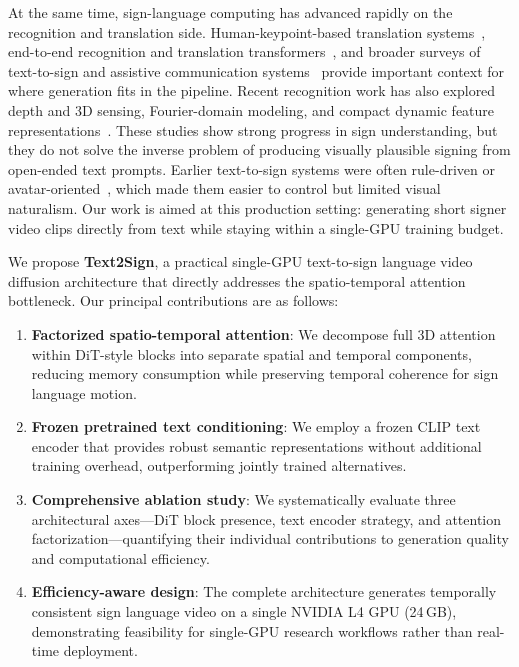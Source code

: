 \documentclass{ieeeaccess}
\begin{document}
At the same time, sign-language computing has advanced rapidly on the recognition and translation side. Human-keypoint-based translation systems~\cite{ko2019neural}, end-to-end recognition and translation transformers~\cite{maia2025mediapipe}, and broader surveys of text-to-sign and assistive communication systems~\cite{kahlon2023systematic,rodriguez2023assistive} provide important context for where generation fits in the pipeline. Recent recognition work has also explored depth and 3D sensing, Fourier-domain modeling, and compact dynamic feature representations~\cite{abdullahi2023idfsign,abdullahi2024fsign,abdullahi2024fourier3d,abdullahi2022prosodic,abdullahi2025redundancy}. These studies show strong progress in sign understanding, but they do not solve the inverse problem of producing visually plausible signing from open-ended text prompts. Earlier text-to-sign systems were often rule-driven or avatar-oriented~\cite{filhol2016rule}, which made them easier to control but limited visual naturalism. Our work is aimed at this production setting: generating short signer video clips directly from text while staying within a single-GPU training budget.

We propose \textbf{Text2Sign}, a practical single-GPU text-to-sign language video diffusion architecture that directly addresses the spatio-temporal attention bottleneck. Our principal contributions are as follows:
\begin{enumerate}
    \item \textbf{Factorized spatio-temporal attention}: We decompose full 3D attention within DiT-style blocks into separate spatial and temporal components, reducing memory consumption while preserving temporal coherence for sign language motion.
    \item \textbf{Frozen pretrained text conditioning}: We employ a frozen CLIP text encoder that provides robust semantic representations without additional training overhead, outperforming jointly trained alternatives.
    \item \textbf{Comprehensive ablation study}: We systematically evaluate three architectural axes---DiT block presence, text encoder strategy, and attention factorization---quantifying their individual contributions to generation quality and computational efficiency.
    \item \textbf{Efficiency-aware design}: The complete architecture generates temporally consistent sign language video on a single NVIDIA L4 GPU (24\,GB), demonstrating feasibility for single-GPU research workflows rather than real-time deployment.
\end{enumerate}
\end{document}

